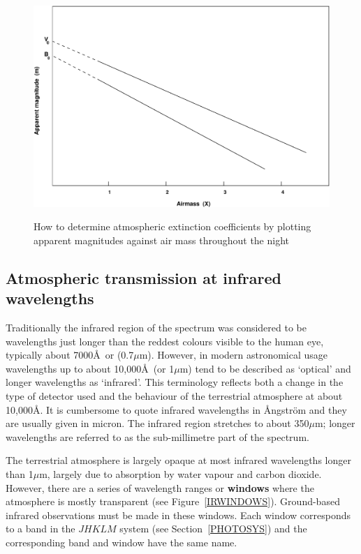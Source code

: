 \documentclass[twoside,11pt,nolof]{starlink}
\begin{document}
\begin{figure}[htbp]
   \centering
   \includegraphics[width=\textwidth]{sc6_airmass}
   \begin{quote}
   \caption{How to determine atmospheric extinction coefficients by
    plotting apparent magnitudes against air mass throughout the night
   \label{AIRMASSP} }
   \end{quote}
\end{figure}

\subsection{\label{IRATMOS}Atmospheric transmission at infrared wavelengths}

Traditionally the infrared region of the spectrum was considered to be
wavelengths just longer than the reddest colours visible to the human
eye, typically about 7000\AA ~or (0.7$\mu$m).  However, in modern
astronomical usage wavelengths up to about 10,000\AA ~(or 1$\mu$m) tend
to be described as `optical' and longer wavelengths as `infrared'.  This
terminology reflects both a change in the type of detector used and the
behaviour of the terrestrial atmosphere at about 10,000\AA .  It is
cumbersome to quote infrared wavelengths in \AA ngstr\"{o}m and they are
usually given in micron.  The infrared region stretches to about 350$\mu$m;
longer wavelengths are referred to as the sub-millimetre part of the
spectrum.

The terrestrial atmosphere is largely opaque at most infrared wavelengths
longer than 1$\mu$m, largely due to absorption by water vapour and
carbon dioxide.  However, there are a series of wavelength ranges or
\textbf{windows} where the atmosphere is mostly transparent (see
Figure~\ref{IRWINDOWS}).  Ground-based infrared observations must be
made in these windows.  Each window corresponds to a band in the $JHKLM$
system (see Section~\ref{PHOTOSYS}) and the corresponding band and window
have the same name.
\end{document}
